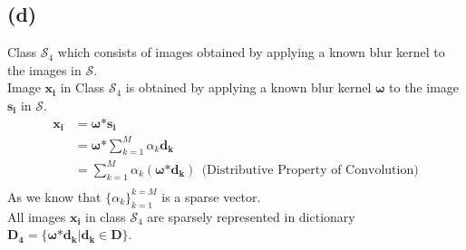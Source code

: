 \documentclass[fleqn, 11pt]{article}
\begin{document}
\medskip

\subsection*{(d)}
Class $\mathcal{S}_4$ which consists of images obtained by applying a known blur kernel to the images in $\mathcal{S}$. \\
Image $\boldsymbol{x_i}$ in Class $\mathcal{S}_4$ is obtained by applying a known blur kernel $\boldsymbol{\omega}$ to the image $\boldsymbol{s_i}$ in $\mathcal{S}$. \\
\begin{equation*}
    \begin{aligned}
        \boldsymbol{x_i} &= \boldsymbol{\omega} \boldsymbol{*} \boldsymbol{s_i} \\
            &= \boldsymbol{\omega} \boldsymbol{*} \sum_{k=1}^{M} \alpha_k \boldsymbol{d_k} \\
            &= \sum_{k=1}^{M} \alpha_k (\boldsymbol{\omega} \boldsymbol{*} \boldsymbol{d_k}) \ \ (\text{Distributive Property of Convolution)}\\
    \end{aligned}
\end{equation*}
As we know that $\{\alpha_k\}_{k=1}^{k=M}$ is a sparse vector. \\
All images $\boldsymbol{x_i}$ in class $\mathcal{S}_4$ are sparsely represented in dictionary $\boldsymbol{D_4} = \{\boldsymbol{\omega} \boldsymbol{*} \boldsymbol{d_k} | \boldsymbol{d_k} \in \boldsymbol{D}\}$. \\

\medskip
\end{document}
